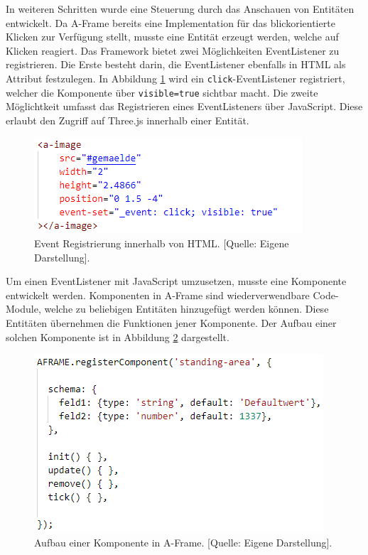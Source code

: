 \documentclass[a4paper,12pt,oneside]{article}
\begin{document}
        In weiteren Schritten wurde eine Steuerung durch das Anschauen von Entitäten
        entwickelt. Da A-Frame bereits eine Implementation für das 
        blickorientierte Klicken zur Verfügung stellt, musste eine
        Entität erzeugt werden, welche auf Klicken reagiert. Das Framework
        bietet zwei Möglichkeiten EventListener zu registrieren. Die Erste
        besteht darin, die EventListener ebenfalls in HTML
        als Attribut festzulegen. In Abbildung \ref{fig:a-image2} wird
        ein \texttt{click}-EventListener registriert, welcher die Komponente 
        über \texttt{visible=true} sichtbar macht. Die zweite Möglichtkeit
        umfasst das Registrieren eines EventListeners über JavaScript. Diese
        erlaubt den Zugriff auf Three.js innerhalb einer Entität.
        \begin{figure}[h]
          \centering
          \includegraphics{img/coding/a-image2.png}
          \caption[Event Registrierung innerhalb von HTML.]{Event Registrierung innerhalb von HTML. [Quelle: Eigene Darstellung].}
          \label{fig:a-image2}
        \end{figure}
        Um einen EventListener mit JavaScript umzusetzen, musste eine Komponente
        entwickelt werden. Komponenten in A-Frame sind wiederverwendbare
        Code-Module, welche zu beliebigen Entitäten hinzugefügt werden
        können. Diese Entitäten übernehmen die Funktionen jener Komponente.
        Der Aufbau einer solchen Komponente ist in Abbildung \ref{fig:komponente1}
        dargestellt.
        \begin{figure}[h]
          \centering
          \includegraphics{img/coding/komponente1.png}
          \caption[Aufbau einer Komponente in A-Frame.]{Aufbau einer Komponente in A-Frame. [Quelle: Eigene Darstellung].}
          \label{fig:komponente1}
        \end{figure} \\
\end{document}
